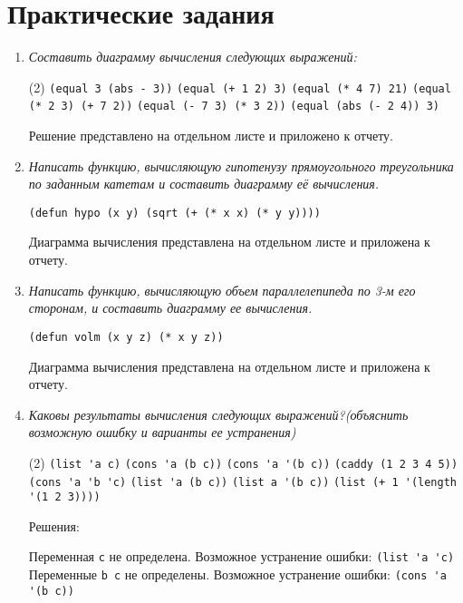 \chapter{Практические задания}

\begin{enumerate}[wide=0pt]
\item \textit{Составить диаграмму вычисления следующих выражений:}
\begin{tasks}[label=\arabic*), item-indent=3pt, after-item-skip=1pt](2)
	\task \lstinline|(equal 3 (abs - 3))|
	\task \lstinline|(equal (+ 1 2) 3)|
	\task \lstinline|(equal (* 4 7) 21)|
	\task \lstinline|(equal (* 2 3) (+ 7 2))|
	\task \lstinline|(equal (- 7 3) (* 3 2))|
	\task \lstinline|(equal (abs (- 2 4)) 3)|
\end{tasks}
Решение представлено на отдельном листе и приложено к отчету.
\item \textit{Написать функцию, вычисляющую гипотенузу прямоугольного треугольника по заданным катетам и составить диаграмму её вычисления.}
\begin{lstlisting}
(defun hypo (x y) (sqrt (+ (* x x) (* y y))))
\end{lstlisting}
Диаграмма вычисления представлена на отдельном листе и приложена к отчету.
\item \textit{Написать функцию, вычисляющую объем параллелепипеда по 3-м его сторонам, и составить диаграмму ее вычисления.}
\begin{lstlisting}
(defun volm (x y z) (* x y z))
\end{lstlisting}
Диаграмма вычисления представлена на отдельном листе и приложена к отчету.
\item \textit{Каковы результаты вычисления следующих выражений?(объяснить возможную ошибку и
варианты ее устранения)}
\begin{tasks}[label=\arabic*), item-indent=3pt, after-item-skip=1pt](2)
	\task \lstinline|(list 'a c)|
	\task \lstinline|(cons 'a (b c))|
	\task \lstinline|(cons 'a '(b c))|
	\task \lstinline|(caddy (1 2 3 4 5))|
	\task \lstinline|(cons 'a 'b 'c)|
	\task \lstinline|(list 'a (b c))|
	\task \lstinline|(list a '(b c))|
	\task \lstinline|(list (+ 1 '(length '(1 2 3))))|
\end{tasks}
Решения:
\begin{tasks}[label=\arabic*), item-indent=3pt, after-item-skip=1pt]
	\task Переменная \lstinline|c| не определена. Возможное устранение ошибки: \lstinline|(list 'a 'c)|
	\task Переменные \lstinline|b c| не определены. Возможное устранение ошибки: \lstinline|(cons 'a '(b c))|

\end{tasks}
\end{enumerate}
